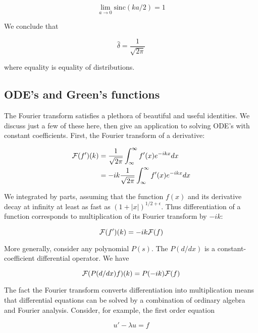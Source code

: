 \begin{equation}
\lim_{a\to 0} \text{sinc}(ka/2)  = 1
\end{equation}

We conclude that 

\begin{equation}
\hat \delta = \frac{1}{\sqrt{2\pi}}
\end{equation}

where equality is equality of distributions.

\subsection{ODE's and Green's functions}

The Fourier transform satisfies a plethora of beautiful and useful identities.  We discuss just a few of these here, then give an application to solving ODE's with constant coefficients.  First, the Fourier transform of a derivative:

\begin{align}
\mathcal{F}(f')(k) &= \frac{1}{\sqrt{2\pi}}\int_{\infty}^{\infty} f'(x) e^{-ikx}dx \\
&= -ik\frac{1}{\sqrt{2\pi}}\int_{\infty}^{\infty} f'(x) e^{-ikx}dx
\end{align}

We integrated by parts, assuming that the function $f(x)$ and its derivative decay at infinity at least as fast as $(1 + |x|)^{1/2 + \epsilon}$.  Thus differentiation of a function corresponds to multiplication of its Fourier transform by $-ik$:

\begin{equation}
\mathcal{F}(f')(k) = -ik\mathcal{F}(f)
\end{equation}

More generally, consider any polynomial $P(s)$.  The $P(d/dx)$ is a constant-coefficient differential operator.  We have

\begin{equation}
\mathcal{F}(P(d/dx)f)(k) = P(-ik)\mathcal{F}(f)
\end{equation}

The fact the Fourier transform converts differentiation into multiplication means that differential equations can be solved by a combination of ordinary algebra and Fourier analysis.  Consider, for example, the first order equation 

\begin{equation}
\label{ode1}
 u' - \lambda u = f
\end{equation}

